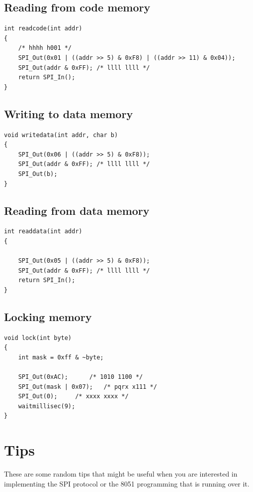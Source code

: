 \documentclass[a4paper]{article}
\begin{document}
\subsection{Reading from code memory}

\begin{lstlisting}
int readcode(int addr)
{
    /* hhhh h001 */
	SPI_Out(0x01 | ((addr >> 5) & 0xF8) | ((addr >> 11) & 0x04));
	SPI_Out(addr & 0xFF); /* llll llll */
	return SPI_In();
}
\end{lstlisting}

\subsection{Writing to data memory}

\begin{lstlisting}
void writedata(int addr, char b)
{
	SPI_Out(0x06 | ((addr >> 5) & 0xF8));
	SPI_Out(addr & 0xFF); /* llll llll */
	SPI_Out(b);
}
\end{lstlisting}

\subsection{Reading from data memory}
\begin{lstlisting}
int readdata(int addr)
{

	SPI_Out(0x05 | ((addr >> 5) & 0xF8));
	SPI_Out(addr & 0xFF); /* llll llll */
	return SPI_In();
}
\end{lstlisting}

\subsection{Locking memory}

\begin{lstlisting}
void lock(int byte)
{
	int mask = 0xff & ~byte;

	SPI_Out(0xAC);		/* 1010 1100 */
	SPI_Out(mask | 0x07);	/* pqrx x111 */
	SPI_Out(0);		/* xxxx xxxx */
	waitmillisec(9);
}
\end{lstlisting}

\section{Tips}

These are some random tips that might be useful when you are interested in
implementing the SPI protocol or the 8051 programming that is running over it.
\end{document}
